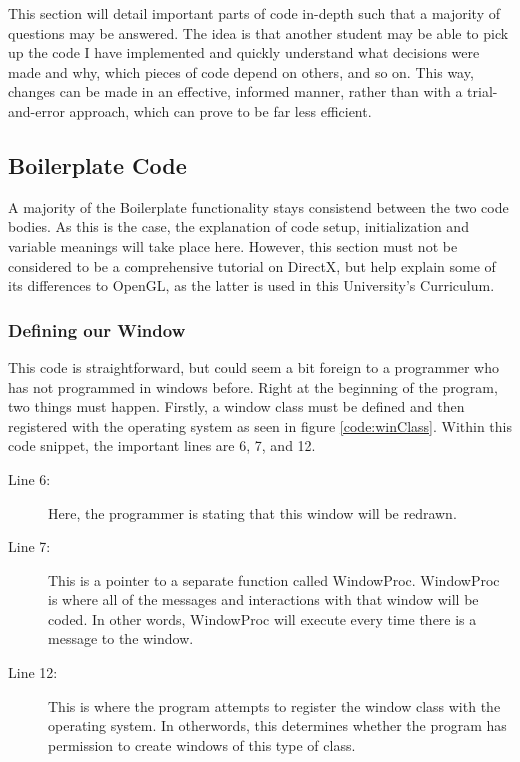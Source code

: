 \documentclass[a4paper, 12pt]{article}
\begin{document}
This section will detail important parts of code in-depth such that a majority
of questions may be answered. The idea is that another student may be able to
pick up the code I have implemented and quickly understand what decisions were
made and why, which pieces of code depend on others, and so on. This way,
changes can be made in an effective, informed manner, rather than with a
trial-and-error approach, which can prove to be far less efficient.

\subsection{Boilerplate Code}
\label{subsection:BoilerPlateImplementation}

A majority of the Boilerplate functionality stays consistend between the two
code bodies. As this is the case, the explanation of code setup,
initialization and variable meanings will take place here. However, this
section must not be considered to be a comprehensive tutorial on DirectX, but
help explain some of its differences to OpenGL, as the latter is used in this
University's Curriculum.

\subsubsection{Defining our Window}

This code is straightforward, but could seem a bit foreign to a programmer who
has not programmed in windows before. Right at the beginning of the program,
two things must happen. Firstly, a window class must be defined and then
registered with the operating system as seen in figure  \ref{code:winClass}.
Within this code snippet, the important lines are 6, 7, and 12.

\begin{description}

\item[Line 6:] Here, the programmer is stating that this window will be 
redrawn.

\item[Line 7:] This is a pointer to a separate function called WindowProc.
WindowProc is where all of the messages and interactions with that window
will be coded. In other words, WindowProc will execute every time there is a
message to the window.

\item[Line 12:] This is where the program attempts to register the window
class with the operating system. In otherwords, this determines whether the
program has permission to create windows of this type of class.

\end{description}
\end{document}
